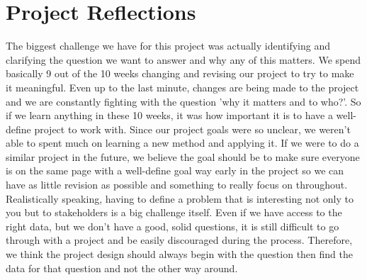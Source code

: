 \documentclass[12pt]{article}
\begin{document}
\section{Project Reflections} \label{sec:Reflections}
The biggest challenge we have for this project was actually identifying and clarifying the question we want to answer and why any of this matters. We spend basically 9 out of the 10 weeks changing and revising our project to try to make it meaningful. Even up to the last minute, changes are being made to the project and we are constantly fighting with the question 'why it matters and to who?'. So if we learn anything in these 10 weeks, it was how important it is to have a well-define project to work with. Since our project goals were so unclear, we weren't able to spent much on learning a new method and applying it. If we were to do a similar project in the future, we believe the goal should be to make sure everyone is on the same page with a well-define goal way early in the project so we can have as little revision as possible and something to really focus on throughout. Realistically speaking, having to define a problem that is interesting not only to you but to stakeholders is a big challenge itself. Even if we have access to the right data, but we don't have a good, solid questions, it is still difficult to go through with a project and be easily discouraged during the process. Therefore, we think the project design should always begin with the question then find the data for that question and not the other way around. 
\end{document}
